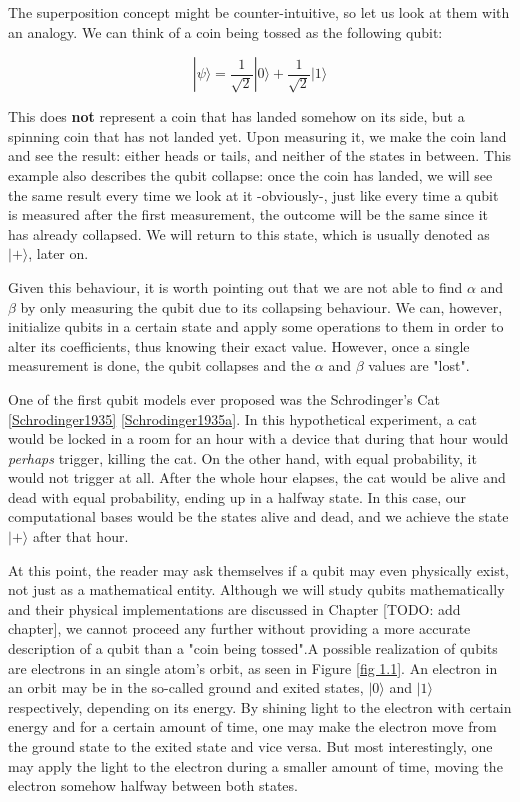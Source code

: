 	The superposition concept might be counter-intuitive, so let us look at them with an analogy. We can think of a coin being tossed as the following qubit:
	
	$$ |\psi\rangle = \frac{1}{\sqrt{2}} |0\rangle + \frac{1}{\sqrt{2}} |1\rangle $$
	
	This does \textbf{not} represent a coin that has landed somehow on its side, but a spinning coin that has not landed yet. Upon measuring it, we make the coin land and see the result: either heads or tails, and neither of the states in between. This example also describes the qubit collapse: once the coin has landed, we will see the same result every time we look at it -obviously-, just like every time a qubit is measured after the first measurement, the outcome will be the same since it has already collapsed. We will return to this state, which is usually denoted as $|+\rangle$, later on.
	
	Given this behaviour, it is worth pointing out that we are not able to find $\alpha$ and $\beta$ by only measuring the qubit due to its collapsing behaviour. We can, however, initialize qubits in a certain state and apply some operations to them in order to alter its coefficients, thus knowing their exact value. However, once a single measurement is done, the qubit collapses and the $\alpha$ and $\beta$ values are "lost".
	
	One of the first qubit models ever proposed was the Schrodinger's Cat \ref{Schrodinger1935} \ref{Schrodinger1935a}. In this hypothetical experiment, a cat would be locked in a room for an hour with a device that during that hour would \emph{perhaps} trigger, killing the cat. On the other hand, with equal probability, it would not trigger at all. After the whole hour elapses, the cat would be alive and dead with equal probability, ending up in a halfway state. In this case, our computational bases would be the states alive and dead, and we achieve the state $|+\rangle$ after that hour.
	
	At this point, the reader may ask themselves if a qubit may even physically exist, not just as a mathematical entity. Although we will study qubits mathematically and their physical implementations are discussed in Chapter [TODO: add chapter], we cannot proceed any further without providing a more accurate description of a qubit than a "coin being tossed".A possible realization of qubits are electrons in an single atom's orbit, as seen in Figure \ref{fig 1.1}. An electron in an orbit may be in the so-called ground and exited states, $|0\rangle$ and $|1\rangle$ respectively, depending on its energy. By shining light to the electron with certain energy and for a certain amount of time, one may make the electron move from the ground state to the exited state and vice versa. But most interestingly, one may apply the light to the electron during a smaller amount of time, moving the electron somehow halfway between both states.
	
